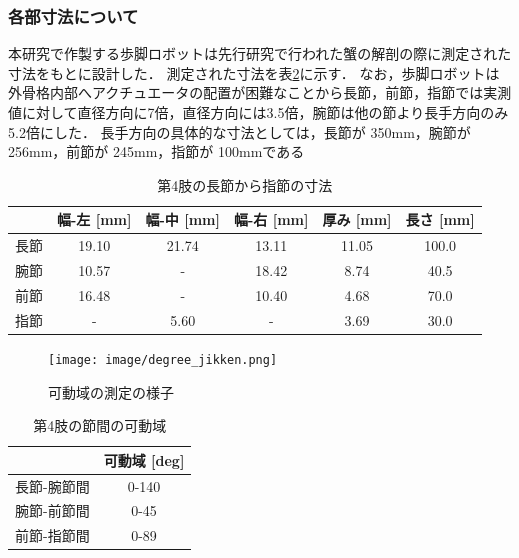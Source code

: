 \subsubsection{各部寸法について}
本研究で作製する歩脚ロボットは先行研究\cite{hasegawa}で行われた蟹の解剖の際に測定された寸法をもとに設計した．
測定された寸法を表\ref{tab:4setukadou}に示す．
なお，歩脚ロボットは外骨格内部へアクチュエータの配置が困難なことから長節，前節，指節では実測値に対して直径方向に7倍，直径方向には3.5倍，腕節は他の節より長手方向のみ5.2倍にした．
長手方向の具体的な寸法としては，長節が 350mm，腕節が 256mm，前節が 245mm，指節が 100mmである
\begin{table}[h]
  \centering
  \caption{第4肢の長節から指節の寸法}
  \label{tab:4setu}
  \vspace{-3mm}
  \begin{tabular}{|l|c|c|c|c|c|}
  \hline
     & \multicolumn{1}{l|}{幅-左 [mm]} & \multicolumn{1}{l|}{幅-中 [mm]} & \multicolumn{1}{l|}{幅-右 [mm]} & \multicolumn{1}{l|}{厚み [mm]} & \multicolumn{1}{l|}{長さ [mm]} \\ \hline
  長節 & 19.10                       & 21.74                       & 13.11                       & 11.05                       & 100.0                       \\ \hline
  腕節 & 10.57                       & -                           & 18.42                       & 8.74                        & 40.5                        \\ \hline
  前節 & 16.48                       & -                           & 10.40                       & 4.68                        & 70.0                        \\ \hline
  指節 & -                           & 5.60                        & -                           & 3.69                        & 30.0                        \\ \hline
  \end{tabular}
\end{table}
\begin{figure}
  \centering
  \texttt{[image: image/degree\_jikken.png]}
  \caption{可動域の測定の様子}
  \label{fig:sokutei}
\end{figure}
\begin{table}[!t]
  \centering
  \vspace{5mm}
  \caption{第4肢の節間の可動域}
  \label{tab:4setukadou}
  \vspace{-3mm}
  \begin{tabular}{|l|c|}
  \hline
         & \multicolumn{1}{l|}{可動域 {[}deg{]}} \\ \hline
  長節-腕節間 & 0-140                            \\ \hline
  腕節-前節間 & 0-45                             \\ \hline
  前節-指節間 & 0-89                            \\ \hline
  \end{tabular}
\end{table}
\clearpage

